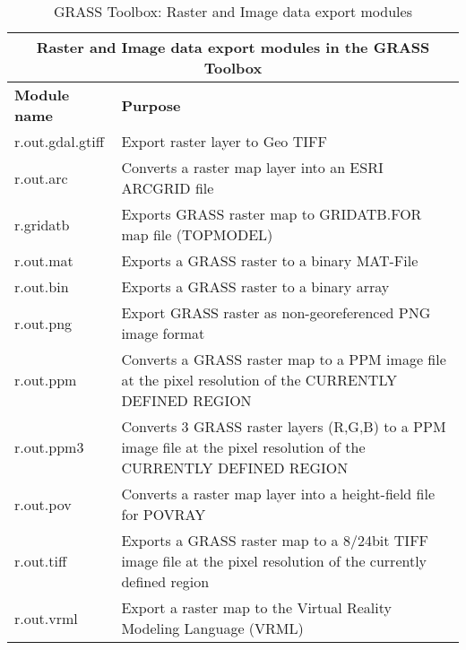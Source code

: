 \begin{table}[ht]
\centering
\caption{GRASS Toolbox: Raster and Image data export modules}\medskip
 \begin{tabular}{|p{4cm}|p{12cm}|}
  \hline \multicolumn{2}{|c|}{\textbf{Raster and Image data export modules in
the GRASS
  Toolbox}} \\
  \hline \textbf{Module name} & \textbf{Purpose} \\
  \hline r.out.gdal.gtiff & Export raster layer to Geo TIFF \\
  \hline r.out.arc & Converts a raster map layer into an ESRI ARCGRID file \\
  \hline r.gridatb & Exports GRASS raster map to GRIDATB.FOR map file
  (TOPMODEL) \\
  \hline r.out.mat & Exports a GRASS raster to a binary MAT-File \\
  \hline r.out.bin & Exports a GRASS raster to a binary array \\
  \hline r.out.png & Export GRASS raster as non-georeferenced PNG image
  format \\
  \hline r.out.ppm & Converts a GRASS raster map to a PPM image file at the
  pixel resolution of the CURRENTLY DEFINED REGION \\
  \hline r.out.ppm3 & Converts 3 GRASS raster layers (R,G,B) to a PPM image
  file at the pixel resolution of the CURRENTLY DEFINED REGION \\
  \hline r.out.pov & Converts a raster map layer into a height-field file for
  POVRAY\\
  \hline r.out.tiff & Exports a GRASS raster map to a 8/24bit TIFF image file
  at the pixel resolution of the currently defined region\\
  \hline r.out.vrml &  Export a raster map to the Virtual Reality Modeling
  Language (VRML)\\
\hline
\end{tabular}
\end{table}

\newpage

